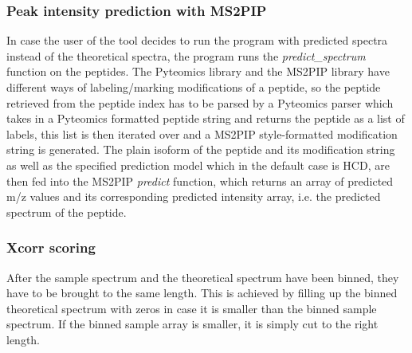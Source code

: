 \documentclass[11pt]{article}
\begin{document}
\subsubsection{Peak intensity prediction with MS2PIP}
In case the user of the tool decides to run the program with predicted spectra instead of the theoretical spectra, the program runs the \textit{predict\_spectrum} function on the peptides. The Pyteomics library and the MS2PIP library have different ways of labeling/marking modifications of a peptide, so the peptide retrieved from the peptide index has to be parsed by a Pyteomics parser which takes in a Pyteomics formatted peptide string and returns the peptide as a list of labels, this list is then iterated over and a MS2PIP style-formatted modification string is generated. The plain isoform of the peptide and its modification string as well as the specified prediction model which in the default case is HCD, are then fed into the MS2PIP \textit{predict} function, which returns an array of predicted m/z values and its corresponding predicted intensity array, i.e. the predicted spectrum of the peptide.

\subsubsection{Xcorr scoring}
After the sample spectrum and the theoretical spectrum have been binned, they have to be brought to the same length. This is achieved by filling up the binned theoretical spectrum with zeros in case it is smaller than the binned sample spectrum. If the binned sample array is smaller, it is simply cut to the right length. 
\end{document}
